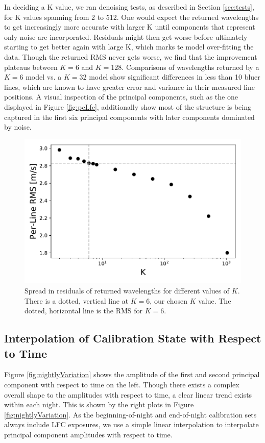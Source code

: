 \documentclass[modern]{aastex63}
\begin{document}
In deciding a K value, we ran denoising tests, as described in Section \ref{sec:tests}, for K values spanning from 2 to 512.  One would expect the returned wavelengths to get increasingly more accurate with larger K until components that represent only noise are incorporated.  Residuals might then get worse before ultimately starting to get better again with large K, which marks te model over-fitting the data.  Though the returned RMS never gets worse, we find that the improvement plateaus between $K=6$ and $K=128$.  Comparisons of wavelengths returned by a $K=6$ model vs. a $K=32$ model show significant differences in less than 10 bluer lines, which are known to have greater error and variance in their measured line positions.  A visual inspection of the principal components, such as the one displayed in Figure \ref{fig:pcLfc}, additionally show most of the structure is being captured in the first six principal components with later components dominated by noise.


\begin{figure}[t]
\centering
\includegraphics[width=.5\textwidth]{Figures/kvals_all.pdf}
\caption{Spread in residuals of returned wavelengths for different values of $K$.  There is a dotted, vertical line at $K=6$, our chosen $K$ value.  The dotted, horizontal line is the RMS for $K=6$.}
\label{fig:kvals}
\end{figure}

\subsection{Interpolation of Calibration State with Respect to Time}
\label{sec:choice_avt}
Figure \ref{fig:nightlyVariation} shows the amplitude of the first and second principal component with respect to time on the left.  Though there exists a complex overall shape to the amplitudes with respect to time, a clear linear trend exists within each night.  This is shown by the right plots in Figure  \ref{fig:nightlyVariation}.  As the beginning-of-night and end-of-night calibration sets always include LFC exposures, we use a simple linear interpolation to interpolate principal component amplitudes with respect to time.
\end{document}
